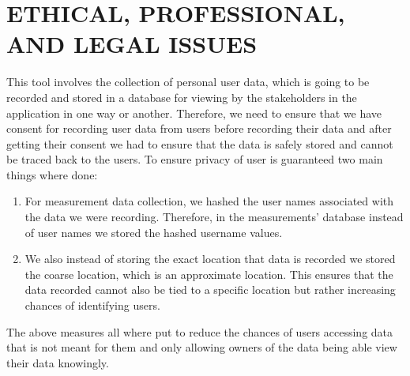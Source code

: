 \section{ETHICAL, PROFESSIONAL, AND LEGAL ISSUES}\label{sec:ethical,-professional,-and-legal-issues}
This tool involves the collection of personal user data, which is going to be recorded and stored in a database for viewing by the stakeholders in the application in one way or another.
Therefore, we need to ensure that we have consent for recording user data from users before recording their data and after getting their consent we had to ensure that the data is safely stored and cannot be traced back to the users.
To ensure privacy of user is guaranteed two main things where done:
\begin{enumerate}
    \item For measurement data collection, we hashed the user names associated with the data we were recording.
    Therefore, in the measurements' database instead of user names we stored the hashed username values.
    \item We also instead of storing the exact location that data is recorded we stored the coarse location, which is an approximate location.
    This ensures that the data recorded cannot also be tied to a specific location but rather increasing chances of identifying users.
\end{enumerate}
The above measures all where put to reduce the chances of users accessing data that is not meant for them and only allowing owners of the data being able view their data knowingly.
